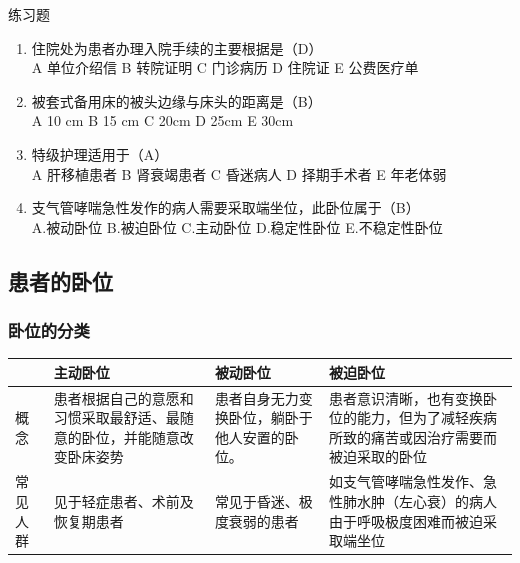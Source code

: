 \documentclass[11pt, a4paper]{ctexart}
\begin{document}
\begin{examplebox}{练习题}
\begin{enumerate}
    \item 住院处为患者办理入院手续的主要根据是（D）\\
    A 单位介绍信 \quad B 转院证明 \quad C 门诊病历 \quad D 住院证 \quad E 公费医疗单
    \item 被套式备用床的被头边缘与床头的距离是（B）\\
    A 10 cm \quad B 15 cm \quad C 20cm \quad D 25cm \quad E 30cm
    \item 特级护理适用于（A）\\
    A 肝移植患者 \quad B 肾衰竭患者 \quad C 昏迷病人 \quad D 择期手术者 \quad E 年老体弱
    \item 支气管哮喘急性发作的病人需要采取端坐位，此卧位属于（B）\\
    A.被动卧位 \quad B.被迫卧位 \quad C.主动卧位 \quad D.稳定性卧位 \quad E.不稳定性卧位
\end{enumerate}
\end{examplebox}

\subsection{患者的卧位}
\subsubsection{卧位的分类}
\begin{table}[htbp]
\centering
\begin{tabular}{|p{2.5cm}|p{4cm}|p{4cm}|p{4cm}|}
\hline
 & \textbf{主动卧位} & \textbf{被动卧位} & \textbf{被迫卧位} \\
\hline
概念 & 患者根据自己的意愿和习惯采取最舒适、最随意的卧位，并能随意改变卧床姿势 & 患者自身无力变换卧位，躺卧于他人安置的卧位。 & 患者意识清晰，也有变换卧位的能力，但为了减轻疾病所致的痛苦或因治疗需要而被迫采取的卧位 \\
\hline
常见人群 & 见于轻症患者、术前及恢复期患者 & 常见于昏迷、极度衰弱的患者 & 如支气管哮喘急性发作、急性肺水肿（左心衰）的病人由于呼吸极度困难而被迫采取端坐位 \\
\hline
\end{tabular}
\end{table}
\end{document}
